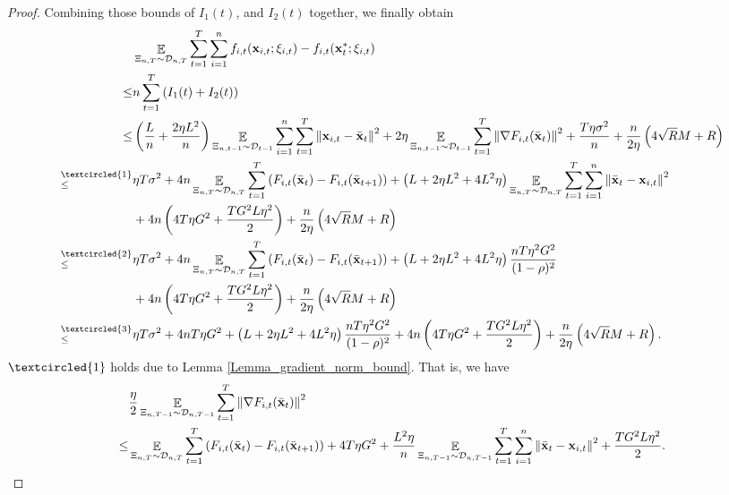 \documentclass{article}
\begin{document}
\begin{proof}
 
Combining those bounds of $I_1(t)$, and $I_2(t)$ together, we finally obtain
\begin{align}
\nonumber
& \EE_{ \Xi_{n,T} \sim \Dcal_{n,T} } \sum_{t=1}^T\sum_{i=1}^n f_{i,t}(\x_{i,t};\xi_{i,t}) - f_{i,t}(\x_t^\ast;\xi_{i,t}) \\ \nonumber
\le & n \sum_{t=1}^T \lrincir{ I_1(t) + I_2(t) } \\ \nonumber
\le & \lrincir{ \frac{L}{n} + \frac{2\eta L^2}{n} }\EE_{ \Xi_{n,t-1} \sim \Dcal_{t-1} }\sum_{i=1}^n\sum_{t=1}^T\lrnorm{\x_{i,t} - \bar{\x}_t }^2   + 2\eta  \EE_{ \Xi_{n,t-1} \sim \Dcal_{t-1} }\sum_{t=1}^T\lrnorm{\nabla F_{i,t}(\bar{\x}_t)}^2 + \frac{T\eta  \sigma^2}{n}   + \frac{n}{2\eta}\lrincir{ 4\sqrt{R}M + R  } \\ \nonumber
\refabovecir{\le}{\textcircled{1}} & \eta T \sigma^2 + 4n \EE_{ \Xi_{n,T} \sim \Dcal_{n,T} } \sum_{t=1}^T  \lrincir{F_{i,t}(\bar{\x}_t) - F_{i,t}(\bar{\x}_{t+1})}  +  \lrincir{L + 2\eta L^2  + 4L^2 \eta}  \EE_{ \Xi_{n,T} \sim \Dcal_{n,T} }\sum_{t=1}^T\sum_{i=1}^n \lrnorm{ \bar{\x}_t - \x_{i,t} }^2  \\ \nonumber
& + 4n \lrincir{ 4T  \eta G^2 + \frac{TG^2L\eta^2}{2} }  + \frac{n}{2\eta}\lrincir{ 4\sqrt{R}M + R  }\\ \nonumber
\refabovecir{\le}{\textcircled{2}} & \eta T \sigma^2 + 4n \EE_{ \Xi_{n,T} \sim \Dcal_{n,T} } \sum_{t=1}^T  \lrincir{F_{i,t}(\bar{\x}_t) - F_{i,t}(\bar{\x}_{t+1})}  +  \lrincir{ L + 2\eta L^2  + 4L^2 \eta}  \frac{nT\eta^2 G^2 }{(1-\rho)^2}  \\ \nonumber
& + 4n \lrincir{ 4T  \eta G^2 + \frac{TG^2L\eta^2}{2} }  + \frac{n}{2\eta}\lrincir{ 4\sqrt{R}M + R  } \\ \nonumber
\refabovecir{\le}{\textcircled{3}} & \eta T \sigma^2 + 4n  T\eta G^2  + \lrincir{ L + 2\eta L^2  + 4L^2 \eta}  \frac{nT\eta^2 G^2 }{(1-\rho)^2}  + 4n\lrincir{ 4T  \eta G^2 + \frac{TG^2L\eta^2}{2} }  + \frac{n}{2\eta}\lrincir{ 4\sqrt{R}M + R  }.
\end{align}  
$\textcircled{1}$ holds due to Lemma \ref{Lemma_gradient_norm_bound}. That is, we have
\begin{align}
\nonumber
& \frac{\eta}{2} \EE_{ \Xi_{n,T-1} \sim \Dcal_{n,T-1} }\sum_{t=1}^T \lrnorm{\nabla F_{i,t}(\bar{\x}_t)}^2 \\ \nonumber
\le & \EE_{ \Xi_{n,T} \sim \Dcal_{n,T} } \sum_{t=1}^T  \lrincir{F_{i,t}(\bar{\x}_t) - F_{i,t}(\bar{\x}_{t+1})} + 4T  \eta G^2 + \frac{ L^2 \eta}{n}\EE_{ \Xi_{n,T-1} \sim \Dcal_{n,T-1} }\sum_{t=1}^T\sum_{i=1}^n \lrnorm{ \bar{\x}_t - \x_{i,t} }^2 + \frac{TG^2L\eta^2}{2}.

\end{align}
\end{proof}
\end{document}
